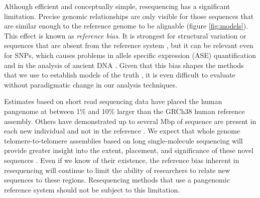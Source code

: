 Although efficient and conceptually simple, resequencing has a significant limitation.
Precise genomic relationships are only visible for those sequences that are similar enough to the reference genome to be alignable (figure \ref{fig:models}).
This effect is known as \emph{reference bias}.
It is strongest for structural variation or sequences that are absent from the reference system \cite{sudmant2015integrated}, but it can be relevant even for SNPs, which causes problems in allele specific expression (ASE) quantification \cite{Castel2015-ef} and in the analysis of ancient DNA \cite{zhou2017antcaller}.
Given that this bias shapes the methods that we use to establish models of the truth \cite{zook2014integrating}, it is even difficult to evaluate without paradigmatic change in our analysis techniques.

Estimates based on short read sequencing data have placed the human pangenome at between 1\% \cite{li2010building} and 10\% \cite{sherman2019assembly} larger than the GRCh38 human reference assembly.
Others have demonstrated up to several Mbp of sequence are present in each new individual and not in the reference \cite{Hehir-Kwa2016-hb,Audano_2019}.
We expect that whole genome telomere-to-telomere assemblies based on long single-molecule sequencing will provide greater insight into the extent, placement, and significance of these novel sequences \cite{miga2019telomere,Langley_2019}.
Even if we know of their existence, the reference bias inherent in resequencing will continue to limit the ability of researchers to relate new sequences to these regions.
Resequencing methods that use a pangenomic reference system should not be subject to this limitation.


